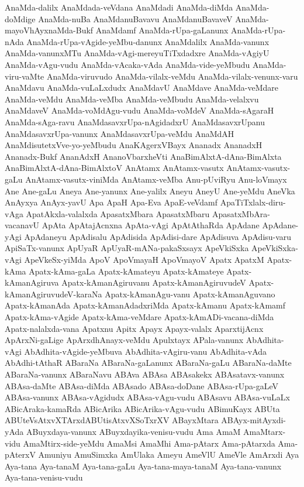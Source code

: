 {AnaMda-dalilx
AnaMdada-veVdana
AnaMdadi
AnaMda-diMda
AnaMda-doMdige
AnaMda-nuBa
AnaMdanuBavavu
AnaMdanuBavaveV
AnaMda-mayoVhAyxnaMda-Bukf
AnaMdamf
AnaMda-rUpa-gaLanunx
AnaMda-rUpa-nAda
AnaMda-rUpa-vAgide-yeMbu-danunx
AnaMdalilx
AnaMda-vanunx
AnaMda-vanunxMTu
AnaMda-vAgi-mereyuTiTxdadxre
AnaMda-vAgiyU
AnaMda-vAgu-vudu
AnaMda-vAcaka-vAda
AnaMda-vide-yeMbudu
AnaMda-viru-vaMte
AnaMda-viruvudo
AnaMda-vilalx-veMdu
AnaMda-vilalx-venunx-varu
AnaMdavu
AnaMda-vuLaLxdudx
AnaMdavU
AnaMdave
AnaMda-veMdare
AnaMda-veMdu
AnaMda-veMba
AnaMda-veMbudu
AnaMda-velalxvu
AnaMdaveV
AnaMda-voMdAgu-vudu
AnaMda-voMdeV
AnaMda-sAgaraH
AnaMda-sAga-ravu
AnaMdasavxrUpa-nAgidadxrU
AnaMdasavxrUpanu
AnaMdasavxrUpa-vanunx
AnaMdasavxrUpa-veMdu
AnaMdAH
AnaMdisutetxVve-yo-yeMbudu
AnaKAgerxVBayx
Ananadx
AnanadxH
Ananadx-Bukf
AnanAdxH
AnanoVbarxheVti
AnaBimAlxtA-dAna-BimAlxta
AnaBimAlxtA-dAna-BimAlxtoV
AnAtamx
AnAtamx-vasutx
AnAtamx-vasutx-gaLu
AnAtamx-vasutx-viniMda
AnAtamx-veMba
Anu-pUviRyu
Anu-loVmayx
Ane
Ane-gaLu
Aneya
Ane-yanunx
Ane-yalilx
Aneyu
AneyU
Ane-yeMdu
AneVka
AnAyxya
AnAyx-yavU
Apa
ApaH
Apa-Eva
ApaE-veVdamf
ApaTiTxlalx-diru-vAga
ApatAkxla-valalxda
ApasatxMbara
ApasatxMbaru
ApasatxMbAra-vacanavU
ApAta
ApAtajAcnxna
ApAta-vAgi
ApAtAthaRda
ApAdane
ApAdane-yAgi
ApAdaneyu
ApAdisalu
ApAdisida
ApAdisi-dare
ApAdisuva
ApAdisu-varu
ApiSaTx-vanunx
ApUyaR
ApUyaR-mANa-pakaSxsayx
ApeVkiSxka
ApeVkiSxka-vAgi
ApeVkeSx-yiMda
ApoV
ApoVmayaH
ApoVmayoV
Apatx
ApatxM
Apatx-kAma
Apatx-kAma-gaLa
Apatx-kAmateyu
Apatx-kAmateye
Apatx-kAmanAgiruva
Apatx-kAmanAgiruvanu
Apatx-kAmanAgiruvudeV
Apatx-kAmanAgiruvudeV-karaNa
Apatx-kAmanAgu-vanu
Apatx-kAmanAguvano
Apatx-kAmanAda
Apatx-kAmanAdadxriMda
Apatx-kAmanu
Apatx-kAmamf
Apatx-kAma-vAgide
Apatx-kAma-veMdare
Apatx-kAmADi-vacana-diMda
Apatx-nalalxda-vana
Apatxnu
Apitx
Apayx
Apayx-valalx
AparxtijAcnx
ApArxNi-gaLige
ApArxdhAnayx-veMdu
Apulxtayx
APala-vanunx
AbAdhita-vAgi
AbAdhita-vAgide-yeMbuva
AbAdhita-vAgiru-vanu
AbAdhita-vAda
AbAdhi-tAthaR
ABaraNa
ABaraNa-gaLanunx
ABaraNa-gaLu
ABaraNa-daMte
ABaraNa-vanunx
ABaraNavu
ABAva
ABAsa
ABAsakekx
ABAsatavx-vanunx
ABAsa-daMte
ABAsa-diMda
ABAsado
ABAsa-doDane
ABAsa-rUpa-gaLeV
ABAsa-vanunx
ABAsa-vAgidudx
ABAsa-vAgu-vudu
ABAsavu
ABAsa-vuLaLx
ABicAraka-kamaRda
ABicArika
ABicArika-vAgu-vudu
ABimuKayx
ABUta
ABUteVsAtxvXTArxdABUtisAtxvXSoTxrXV
ABayxMtara
ABAyx-mitAyxdi-yAda
ABuyxdaya-vanunx
ABuyxdayika-venisu-vudu
Ama
AmaM
AmaMtarx-vidu
AmaMtirx-side-yeMdu
AmaMsi
AmaMhi
Ama-pAtarx
Ama-pAtarxda
Ama-pAterxV
Amuniyu
AmuSimxka
AmUlaka
Ameyu
AmeVlU
AmeVle
AmArxdi
Aya
Aya-tana
Aya-tanaM
Aya-tana-gaLu
Aya-tana-maya-tanaM
Aya-tana-vanunx
Aya-tana-venisu-vudu
}
